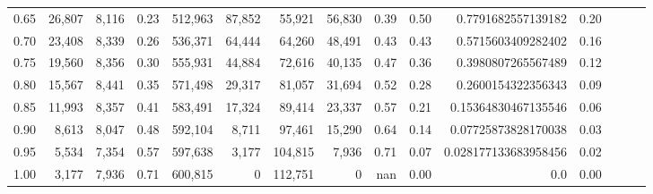 \begin{tabular}{rrrrrrrrrrrrrrr}
0.65 &  26,807 &  8,116 &  0.23 &  512,963 &   87,852 &   55,921 &   56,830 &  0.39 &  0.50 &    0.7791682557139182 &      0.20 \\
0.70 &  23,408 &  8,339 &  0.26 &  536,371 &   64,444 &   64,260 &   48,491 &  0.43 &  0.43 &    0.5715603409282402 &      0.16 \\
0.75 &  19,560 &  8,356 &  0.30 &  555,931 &   44,884 &   72,616 &   40,135 &  0.47 &  0.36 &    0.3980807265567489 &      0.12 \\
0.80 &  15,567 &  8,441 &  0.35 &  571,498 &   29,317 &   81,057 &   31,694 &  0.52 &  0.28 &    0.2600154322356343 &      0.09 \\
0.85 &  11,993 &  8,357 &  0.41 &  583,491 &   17,324 &   89,414 &   23,337 &  0.57 &  0.21 &   0.15364830467135546 &      0.06 \\
0.90 &   8,613 &  8,047 &  0.48 &  592,104 &    8,711 &   97,461 &   15,290 &  0.64 &  0.14 &   0.07725873828170038 &      0.03 \\
0.95 &   5,534 &  7,354 &  0.57 &  597,638 &    3,177 &  104,815 &    7,936 &  0.71 &  0.07 &  0.028177133683958456 &      0.02 \\
1.00 &   3,177 &  7,936 &  0.71 &  600,815 &        0 &  112,751 &        0 &   nan &  0.00 &                   0.0 &      0.00 \\
\bottomrule
\end{tabular}
